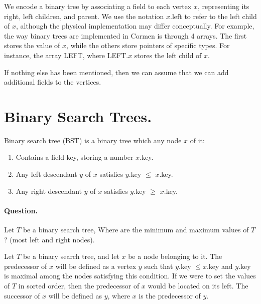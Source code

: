 We encode a binary tree by associating a field to each vertex $x$, representing its right, left children, and parent. We use the notation $x$.left to refer to the left child of $x$, although the physical implementation may differ conceptually. For example, the way binary trees are implemented in Cormen is through 4 arrays. The first stores the value of $x$, while the others store pointers of specific types. For instance, the array LEFT, where LEFT.$x$ stores the left child of $x$.


If nothing else has been mentioned, then we can assume that we can add additional fields to the vertices.


\section{Binary Search Trees.} Binary search tree (BST) is a binary tree which any node $x$ of it: 
\begin{enumerate}
  \item Contains a field key, storing a number $x$.key. 
  \item Any left descendant $y$ of $x$ satisfies $y$.key $\le$ $x$.key. 
  \item Any right descendant $y$ of $x$ satisfies $y$.key $\ge$ $x$.key. 
\end{enumerate}

\paragraph{Question.} Let $T$ be a binary search tree, Where are the minimum and maximum values of $T$? (most left and right nodes). 

\begin{definition}
Let $T$ be a binary search tree, and let $x$ be a node belonging to it. The predecessor of $x$ will be defined as a vertex $y$ such that $y$.key $\leq x$.key and $y$.key is maximal among the nodes satisfying this condition. If we were to set the values of $T$ in sorted order, then the predecessor of $x$ would be located on its left. The successor of $x$ will be defined as $y$, where $x$ is the predecessor of $y$.
\end{definition}

